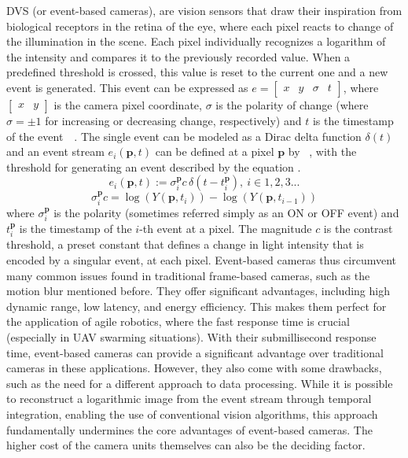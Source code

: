 \ac{DVS} (or event-based cameras), are vision sensors that draw their inspiration from biological receptors in the retina of the eye, where each pixel reacts
to change of the illumination in the scene. Each pixel individually recognizes a logarithm of the intensity and compares it to the previously
recorded value. When a predefined threshold is crossed, this value is reset to the current one and a new event is generated. This event can be expressed as $e = \begin{bmatrix} x & y & \sigma & t \end{bmatrix}$, where $\begin{bmatrix} x & y \end{bmatrix}$
is the camera pixel coordinate, $\sigma$ is the polarity of change (where $\sigma = \pm 1$ for increasing or decreasing change, respectively) and $t$ is the timestamp of the event~\cite{gallego22event}~\cite{scheerlinck2018event}. The single event can be modeled as a Dirac delta function $\delta(t)$
and an event stream
$e_i(\boldsymbol{p}, t)$ can be defined at a pixel $\boldsymbol{p}$ by ~\cite{scheerlinck2018event},
with the threshold for generating an event described by the equation .
\begin{equation}
e_i(\boldsymbol{p}, t) := \sigma_i^{\boldsymbol{p}} c \, \delta(t - t_i^{\boldsymbol{p}}), \ i \in 1, 2, 3 ...
\label{eq:event_eq}
\end{equation}
\begin{equation}
\sigma_i^{\boldsymbol{p}} c = \log(Y(\boldsymbol{p}, t_i)) - \log(Y(\boldsymbol{p}, t_{i-1}))
\label{eq:bias_eq}
\end{equation}
where $\sigma_i^{\boldsymbol{p}}$ is the polarity (sometimes referred simply as an ON or OFF event) and $t_i^{\boldsymbol{p}}$ is the timestamp of the $i$-th event at a pixel.
The magnitude $c$ is the contrast threshold, a preset constant that defines a change in light intensity that is encoded by a singular event, at each pixel. Event-based cameras thus circumvent many common issues found in traditional frame-based cameras, such as the motion blur mentioned before. They offer significant advantages, including high dynamic range, low latency,
and energy efficiency.
This makes them perfect for the application of agile robotics,
where the fast response time is crucial (especially in UAV swarming situations). With their submillisecond response time,
event-based cameras can provide a significant advantage over traditional cameras in these applications.
However, they also come with some drawbacks, such as the need for a different approach to
data processing. While it is possible to reconstruct a logarithmic image from the event stream through temporal integration,
enabling the use of conventional vision algorithms, this approach fundamentally undermines the core advantages of event-based cameras.
The higher cost of the camera units themselves can also be the deciding factor.~\cite{gallego22event}

